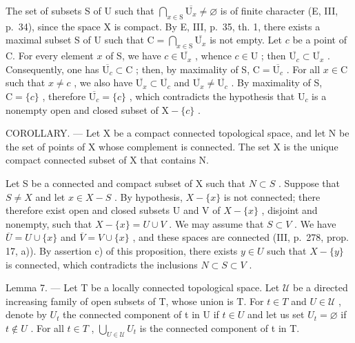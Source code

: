 The set of subsets S of U such that \(\bigcap_{x\in\mathrm{S}}\overline{\mathrm{U}_{x}}\neq\varnothing\) is of finite character (E, III, p.~34), since the space X is compact. By E, III, p.~35, th. 1, there exists a maximal subset S of U such that \(\mathrm{C}=\bigcap_{x\in\mathrm{S}}\overline{\mathrm{U}_{x}}\) is not empty. Let \(c\) be a point of C. For every element \(x\) of S, we have \(c\in\overline{\mathrm{U}_{x}}\) , whence \(c\in\mathrm{U}\) ; then \(\overline{\mathrm{U}_{c}}\subset\overline{\mathrm{U}_{x}}\) . Consequently, one has \(\overline{\mathrm{U}_{c}}\subset\mathrm{C}\) ; then, by maximality of S, \(\mathrm{C}=\overline{\mathrm{U}_{c}}\) . For all \(x\in\mathrm{C}\) such that \(x\neq c\) , we also have \(\overline{\mathrm{U}_{x}}\subset\overline{\mathrm{U}_{c}}\) and \(\overline{\mathrm{U}_{x}}\neq\overline{\mathrm{U}_{c}}\) . By maximality of S, \(\mathrm{C}=\{c\}\) , therefore \(\overline{\mathrm{U}_{c}}=\{c\}\) , which contradicts the hypothesis that \(\mathrm{U}_{c}\) is a nonempty open and closed subset of \(\mathrm{X} - \{c\}\) .

COROLLARY. --- Let X be a compact connected topological space, and let N be the set of points of X whose complement is connected. The set X is the unique compact connected subset of X that contains N.

Let S be a connected and compact subset of X such that \(N \subset S\) . Suppose that \(S \neq X\) and let \(x \in X - S\) . By hypothesis, \(X - \{x\}\) is not connected; there therefore exist open and closed subsets U and V of \(X - \{x\}\) , disjoint and nonempty, such that \(X - \{x\} = U \cup V\) . We may assume that \(S \subset V\) . We have \(\overline{U} = U \cup \{x\}\) and \(\overline{V} = V \cup \{x\}\) , and these spaces are connected (III, p.~278, prop. 17, a)). By assertion c) of this proposition, there exists \(y \in U\) such that \(X - \{y\}\) is connected, which contradicts the inclusions \(N \subset S \subset V\) .

Lemma 7. --- Let T be a locally connected topological space. Let \(\mathcal{U}\) be a directed increasing family of open subsets of T, whose union is T. For \(t \in T\) and \(U \in \mathcal{U}\) , denote by \(U_{t}\) the connected component of t in U if \(t \in U\) and let us set \(U_{t} = \varnothing\) if \(t \notin U\) . For all \(t \in T\) , \(\bigcup_{U \in \mathcal{U}} U_{t}\) is the connected component of t in T.

